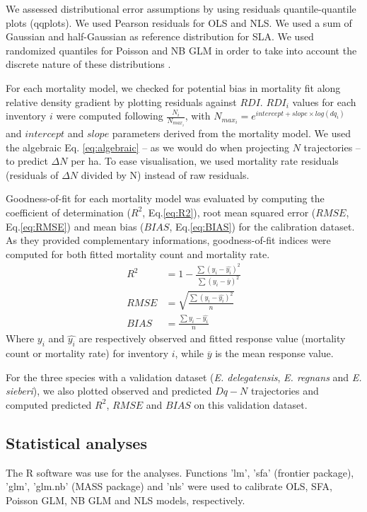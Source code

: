 \documentclass[12pt,english]{article}
\begin{document}
We assessed distributional error assumptions by using residuals quantile-quantile plots (qqplots). We used Pearson residuals for OLS and NLS. We used a sum of Gaussian and half-Gaussian \citep{Bi2001} as reference distribution for SLA. We used randomized quantiles for Poisson and NB GLM in order to take into account the discrete nature of these distributions \citep{DunnSmyth1996}.

For each mortality model, we checked for potential bias in mortality fit along relative density gradient by plotting residuals against $RDI$. $RDI_i$ values for each inventory $i$ were computed following $\frac{N_i}{N_{max_i}}$, with  $N_{max_i}=e^{intercept + slope \times log(dq_i)}$ and $intercept$ and $slope$ parameters derived from the mortality model. We used the algebraic Eq. \ref{eq:algebraic} -- as we would do when projecting $N$ trajectories -- to predict $\Delta N$ per ha. To ease visualisation, we used mortality rate residuals (residuals of $\Delta N$ divided by N) instead of raw residuals.

Goodness-of-fit for each mortality model was evaluated by computing the coefficient of determination ($R^2$, Eq.\ref{eq:R2}), root mean squared error ($RMSE$, Eq.\ref{eq:RMSE}) and mean bias ($BIAS$, Eq.\ref{eq:BIAS}) for the calibration dataset. As they provided complementary informations, goodness-of-fit indices were computed for both fitted mortality count and mortality rate.
\begin{align}
	\label{eq:R2}
	R^2 &= 1 - \frac{ \sum(y_i - \widehat{y_i})^2 } { \sum(y_i - \overline{y})^2 } \\
	\label{eq:RMSE}
	RMSE &= \sqrt{\frac{ \sum(y_i - \widehat{y_i})^2 } {n}} \\
	\label{eq:BIAS}
	BIAS &= \frac{ \sum y_i - \widehat{y_i} } {n}   
\end{align}
Where $y_i$ and $\widehat{y_i}$ are respectively observed and fitted response value (mortality count or mortality rate) for inventory $i$, while $\overline{y}$ is the mean response value.

For the three species with a validation dataset (\textit{E. delegatensis}, \textit{E. regnans} and \textit{E. sieberi}), we also plotted observed and predicted $Dq-N$ trajectories and computed predicted $R^2$, $RMSE$ and $BIAS$ on this validation dataset.

\subsection{Statistical analyses}
The R software \citeyearpar{R2015} was use for the analyses. Functions 'lm', 'sfa' (frontier package), 'glm', 'glm.nb' (MASS package) and 'nls' were used to calibrate OLS, SFA, Poisson GLM, NB GLM and NLS models, respectively.
\end{document}
